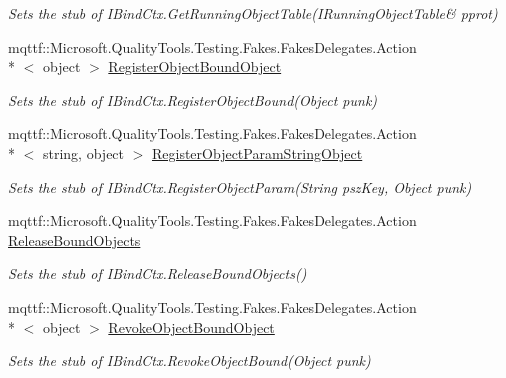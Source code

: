 \begin{DoxyCompactItemize}
\begin{DoxyCompactList}\small\item\em Sets the stub of I\-Bind\-Ctx.\-Get\-Running\-Object\-Table(I\-Running\-Object\-Table\& pprot)\end{DoxyCompactList}\item 
mqttf\-::\-Microsoft.\-Quality\-Tools.\-Testing.\-Fakes.\-Fakes\-Delegates.\-Action\\*
$<$ object $>$ \hyperlink{class_system_1_1_runtime_1_1_interop_services_1_1_com_types_1_1_fakes_1_1_stub_i_bind_ctx_a34672663b8a87c8da6f1c6774e27af40}{Register\-Object\-Bound\-Object}
\begin{DoxyCompactList}\small\item\em Sets the stub of I\-Bind\-Ctx.\-Register\-Object\-Bound(\-Object punk)\end{DoxyCompactList}\item 
mqttf\-::\-Microsoft.\-Quality\-Tools.\-Testing.\-Fakes.\-Fakes\-Delegates.\-Action\\*
$<$ string, object $>$ \hyperlink{class_system_1_1_runtime_1_1_interop_services_1_1_com_types_1_1_fakes_1_1_stub_i_bind_ctx_a38240b00ccf71024570d4abdd3c19a7b}{Register\-Object\-Param\-String\-Object}
\begin{DoxyCompactList}\small\item\em Sets the stub of I\-Bind\-Ctx.\-Register\-Object\-Param(\-String psz\-Key, Object punk)\end{DoxyCompactList}\item 
mqttf\-::\-Microsoft.\-Quality\-Tools.\-Testing.\-Fakes.\-Fakes\-Delegates.\-Action \hyperlink{class_system_1_1_runtime_1_1_interop_services_1_1_com_types_1_1_fakes_1_1_stub_i_bind_ctx_a9ba119c678da92bd1046d69ec0ec36cd}{Release\-Bound\-Objects}
\begin{DoxyCompactList}\small\item\em Sets the stub of I\-Bind\-Ctx.\-Release\-Bound\-Objects()\end{DoxyCompactList}\item 
mqttf\-::\-Microsoft.\-Quality\-Tools.\-Testing.\-Fakes.\-Fakes\-Delegates.\-Action\\*
$<$ object $>$ \hyperlink{class_system_1_1_runtime_1_1_interop_services_1_1_com_types_1_1_fakes_1_1_stub_i_bind_ctx_a2b12986c8fef838f741b06e9bf376704}{Revoke\-Object\-Bound\-Object}
\begin{DoxyCompactList}\small\item\em Sets the stub of I\-Bind\-Ctx.\-Revoke\-Object\-Bound(\-Object punk)\end{DoxyCompactList}\item 

\end{DoxyCompactItemize}
